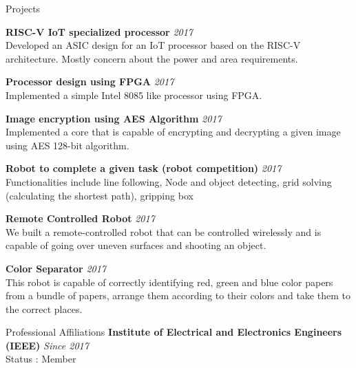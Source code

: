 \documentclass[
11pt, %
]{./assets/resume} %
\begin{document}



\begin{rSection}{Projects}

	\textbf{RISC-V IoT specialized processor} \hfill \textit{2017}\\
	Developed an ASIC design for an IoT processor based on the RISC-V architecture. Mostly concern about the power and area requirements.

	\textbf{Processor design using FPGA} \hfill \textit{2017}\\
	Implemented a simple Intel 8085 like processor using FPGA.

	\textbf{Image encryption using AES Algorithm} \hfill \textit{2017}\\
	Implemented a core that is capable of encrypting and decrypting a given image using AES 128-bit algorithm. 

	\textbf{Robot to complete a given task (robot competition)} \hfill \textit{2017}\\
	Functionalities include line following, Node and object detecting, grid solving (calculating the shortest path), gripping box

	\textbf{Remote Controlled Robot} \hfill \textit{2017}\\
	We built a remote-controlled robot that can be controlled wirelessly and is capable of going over uneven surfaces and shooting an object.

	\textbf{Color Separator} \hfill \textit{2017}\\
	This robot is capable of correctly identifying red, green and blue color papers from a bundle of papers, arrange them according to their colors and take them to the correct places.

\end{rSection}

\begin{rSection}{Professional Affiliations}
	\textbf{Institute of Electrical and Electronics Engineers (IEEE)} \hfill \textit{Since 2017}\\
	Status : Member
	
\end{rSection}
\end{document}
